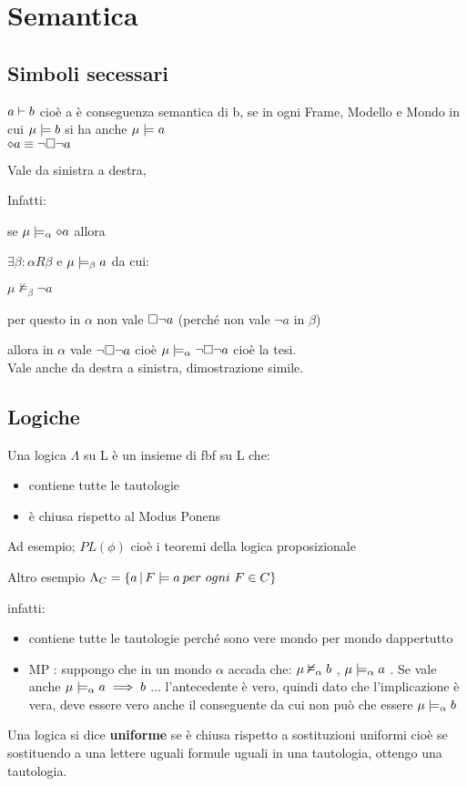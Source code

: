
\chapter{Semantica}


\section{Simboli secessari}

$a\vdash b$ cioè a è conseguenza semantica di b, se in ogni Frame,
Modello e Mondo in cui $\mu\models b$ si ha anche $\mu\models a$\\


$\diamond a\equiv\neg\square\neg a$

Vale da sinistra a destra,

Infatti:

se $\mu\models_{\alpha}\diamond a$ allora

$\exists\beta:$$\alpha R\beta$ e $\mu\models_{\beta}a$ da cui:

$\mu\nvDash_{\beta}\neg a$

per questo in $\alpha$ non vale $\square\neg a$ (perché non vale
$\neg a$ in $\beta$)

allora in $\alpha$ vale $\neg\square\neg a$ cioè $\mu\models_{\alpha}\neg\square\neg a$
cioè la tesi. \\


Vale anche da destra a sinistra, dimostrazione simile. \\



\section{Logiche}

Una logica $\Lambda$ su L è un insieme di fbf su L che: 
\begin{itemize}
\item contiene tutte le tautologie 
\item è chiusa rispetto al Modus Ponens 
\end{itemize}
Ad esempio; $PL(\phi)$ cioè i teoremi della logica proposizionale

Altro esempio $\Lambda_{C}=\{a\,|\,F\models a\: per\ ogni\ F\in C\}$

infatti: 
\begin{itemize}
\item contiene tutte le tautologie perché sono vere mondo per mondo dappertutto 
\item MP : suppongo che in un mondo $\alpha$ accada che: $\mu\nvDash_{\alpha}b$
, $\mu\models_{\alpha}a$ . Se vale anche $\mu\models_{\alpha}a\implies b$
... l'antecedente è vero, quindi dato che l'implicazione è vera, deve
essere vero anche il conseguente da cui non può che essere $\mu\models_{\alpha}b$ 
\end{itemize}
Una logica si dice \textbf{uniforme }se è chiusa rispetto a sostituzioni
uniformi cioè se sostituendo a una lettere uguali formule uguali in
una tautologia, ottengo una tautologia.

